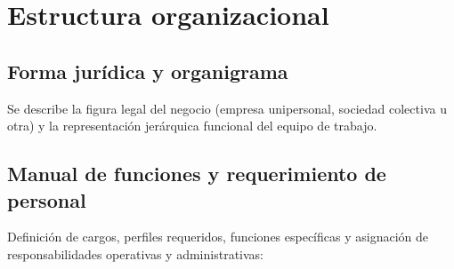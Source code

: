 \section{Estructura organizacional}
\label{sec:estructura_organizacional}

\subsection{Forma jurídica y organigrama}
Se describe la figura legal del negocio (empresa unipersonal, sociedad colectiva u otra) y la representación jerárquica funcional del equipo de trabajo.

\subsection{Manual de funciones y requerimiento de personal}
Definición de cargos, perfiles requeridos, funciones específicas y asignación de responsabilidades operativas y administrativas:



